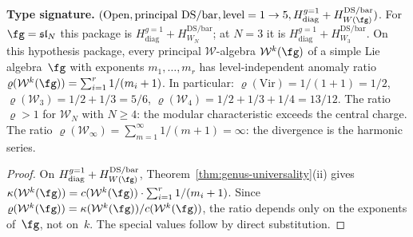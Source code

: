 \begin{corollary}
\label{cor:anomaly-ratio-ds}
\textbf{Type signature.}
$(\mathrm{Open},\mathrm{principal\ DS/bar},\mathrm{level}=1\to5,
H_{\mathrm{diag}}^{g=1}+H_{W(\fg)}^{\mathrm{DS/bar}})$.
For $\fg=\mathfrak{sl}_N$ this package is
$H_{\mathrm{diag}}^{g=1}+H_{W_N}^{\mathrm{DS/bar}}$; at $N=3$ it is
$H_{\mathrm{diag}}^{g=1}+H_{W_3}^{\mathrm{DS/bar}}$.
On this hypothesis package, every principal $\mathcal{W}$-algebra
$\mathcal{W}^k(\fg)$ of a simple Lie algebra~$\fg$ with exponents
$m_1, \ldots, m_r$ has level-independent anomaly ratio
$\varrho(\mathcal{W}^k(\fg)) = \sum_{i=1}^r 1/(m_i + 1)$. In particular:
$\varrho(\mathrm{Vir}) = 1/(1+1) = 1/2$,
$\varrho(\mathcal{W}_3) = 1/2 + 1/3 = 5/6$,
$\varrho(\mathcal{W}_4) = 1/2 + 1/3 + 1/4 = 13/12$.
The ratio $\varrho > 1$ for $\mathcal{W}_N$ with $N \geq 4$: the modular characteristic exceeds the central charge. The ratio $\varrho(\mathcal{W}_\infty) = \sum_{m=1}^\infty 1/(m+1) = \infty$: the divergence is the harmonic series.
\end{corollary}

\begin{proof}
On
$H_{\mathrm{diag}}^{g=1}+H_{W(\fg)}^{\mathrm{DS/bar}}$,
Theorem~\ref{thm:genus-universality}(ii) gives
$\kappa(\mathcal{W}^k(\fg))
 = c(\mathcal{W}^k(\fg))\cdot \sum_{i=1}^r 1/(m_i+1)$.
Since
$\varrho(\mathcal{W}^k(\fg))
 = \kappa(\mathcal{W}^k(\fg))/c(\mathcal{W}^k(\fg))$,
the ratio depends only on the exponents of~$\fg$, not on~$k$.
The special values follow by direct substitution.
\end{proof}

